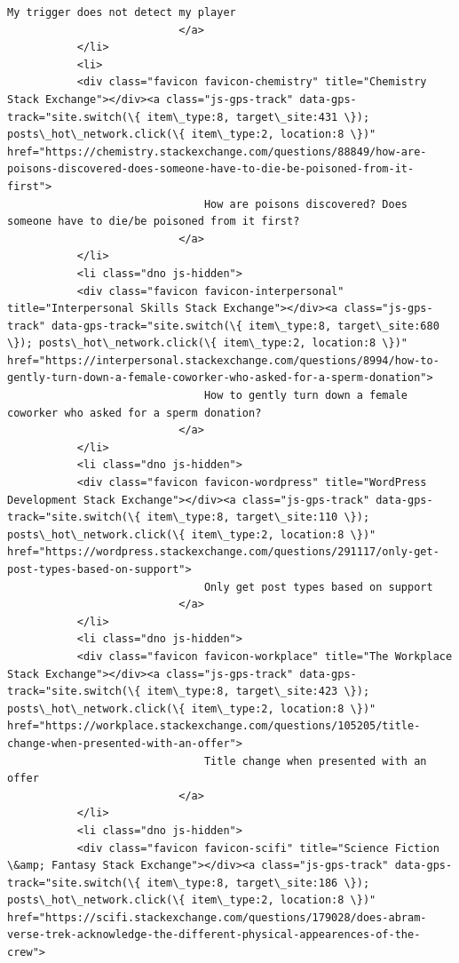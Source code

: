 \documentclass[11pt]{article}
\begin{document}
\begin{Verbatim}[commandchars=\\\{\}]
                               My trigger does not detect my player
                           </a>
           </li>
           <li>
           <div class="favicon favicon-chemistry" title="Chemistry Stack Exchange"></div><a class="js-gps-track" data-gps-track="site.switch(\{ item\_type:8, target\_site:431 \}); posts\_hot\_network.click(\{ item\_type:2, location:8 \})" href="https://chemistry.stackexchange.com/questions/88849/how-are-poisons-discovered-does-someone-have-to-die-be-poisoned-from-it-first">
                               How are poisons discovered? Does someone have to die/be poisoned from it first?
                           </a>
           </li>
           <li class="dno js-hidden">
           <div class="favicon favicon-interpersonal" title="Interpersonal Skills Stack Exchange"></div><a class="js-gps-track" data-gps-track="site.switch(\{ item\_type:8, target\_site:680 \}); posts\_hot\_network.click(\{ item\_type:2, location:8 \})" href="https://interpersonal.stackexchange.com/questions/8994/how-to-gently-turn-down-a-female-coworker-who-asked-for-a-sperm-donation">
                               How to gently turn down a female coworker who asked for a sperm donation?
                           </a>
           </li>
           <li class="dno js-hidden">
           <div class="favicon favicon-wordpress" title="WordPress Development Stack Exchange"></div><a class="js-gps-track" data-gps-track="site.switch(\{ item\_type:8, target\_site:110 \}); posts\_hot\_network.click(\{ item\_type:2, location:8 \})" href="https://wordpress.stackexchange.com/questions/291117/only-get-post-types-based-on-support">
                               Only get post types based on support
                           </a>
           </li>
           <li class="dno js-hidden">
           <div class="favicon favicon-workplace" title="The Workplace Stack Exchange"></div><a class="js-gps-track" data-gps-track="site.switch(\{ item\_type:8, target\_site:423 \}); posts\_hot\_network.click(\{ item\_type:2, location:8 \})" href="https://workplace.stackexchange.com/questions/105205/title-change-when-presented-with-an-offer">
                               Title change when presented with an offer
                           </a>
           </li>
           <li class="dno js-hidden">
           <div class="favicon favicon-scifi" title="Science Fiction \&amp; Fantasy Stack Exchange"></div><a class="js-gps-track" data-gps-track="site.switch(\{ item\_type:8, target\_site:186 \}); posts\_hot\_network.click(\{ item\_type:2, location:8 \})" href="https://scifi.stackexchange.com/questions/179028/does-abram-verse-trek-acknowledge-the-different-physical-appearences-of-the-crew">

\end{Verbatim}
\end{document}
